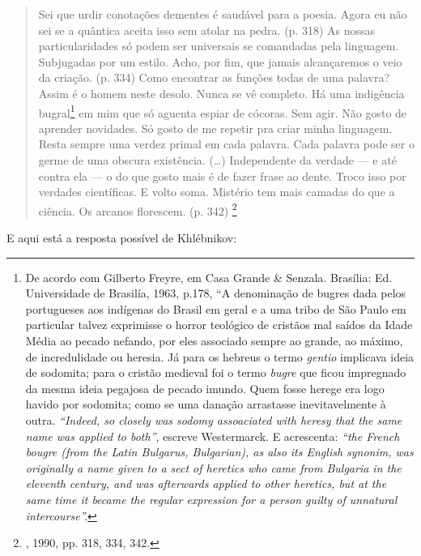 \begin{quote}
Sei que urdir conotações dementes é saudável para a poesia. Agora eu não
sei se a quântica aceita isso sem atolar na pedra. (p. 318) As nossas
particularidades só podem ser universais se comandadas pela linguagem.
Subjugadas por um estilo. Acho, por fim, que jamais alcançaremos o veio
da criação. (p. 334) Como encontrar as funções todas de uma palavra?
Assim é o homem neste desolo. Nunca se vê completo. Há uma indigência
bugral\footnote{De acordo com Gilberto Freyre, em Casa Grande \&
  Senzala. Brasília: Ed. Universidade de Brasilía, 1963, p.178, ``A
  denominação de bugres dada pelos portugueses aos indígenas do Brasil
  em geral e a uma tribo de São Paulo em particular talvez exprimisse o
  horror teológico de cristãos mal saídos da Idade Média ao pecado
  nefando, por eles associado sempre ao grande, ao máximo, de
  incredulidade ou heresia. Já para os hebreus o termo \emph{gentio}
  implicava ideia de sodomita; para o cristão medieval foi o termo
  \emph{bugre} que ficou impregnado da mesma ideia pegajosa de pecado
  imundo. Quem fosse herege era logo havido por sodomita; como se uma
  danação arrastasse inevitavelmente à outra. \emph{``Indeed, so closely
  was sodomy assoaciated with heresy that the same name was
  applied to both''}, escreve Westermarck. E acrescenta: \emph{``the
  French \emph{bougre} (from the Latin \emph{Bulgarus}, \emph{Bulgarian}), as also its English
  synonim, was originally a name given to a sect of heretics who came from
  Bulgaria in the eleventh century, and was afterwards applied to other
  heretics, but at the same time it became the regular expression for
  a person guilty of unnatural intercourse''.}} em mim que só aguenta
espiar de cócoras. Sem agir. Não gosto de aprender novidades. Só gosto
de me repetir pra criar minha linguagem. Resta sempre uma verdez primal
em cada palavra. Cada palavra pode ser o germe de uma obscura
existência. (\ldots{}) Independente da verdade --- e até contra ela --- o do
que gosto mais é de fazer frase ao dente. Troco isso por verdades
científicas. E volto soma. Mistério tem mais camadas do que a ciência.
Os arcanos florescem. (p. 342) \footnote{, 1990, pp. 318, 334,
  342.}
\end{quote}

E aqui está a resposta possível de Khlébnikov:

